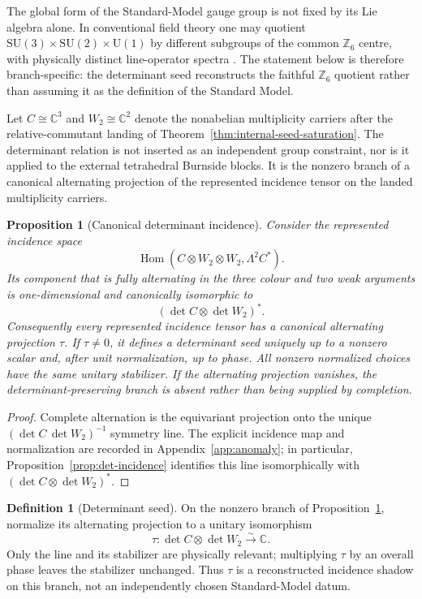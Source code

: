 \documentclass[11pt]{article}
\newtheorem{proposition}[theorem]{Proposition}
\theoremstyle{definition}
\newtheorem{definition}[theorem]{Definition}
\theoremstyle{remark}
\newcommand{\Z}{\mathbb Z}
\newcommand{\C}{\mathbb C}
\newcommand{\Hom}{\operatorname{Hom}}
\newcommand{\U}{\mathrm U}
\newcommand{\SU}{\mathrm{SU}}
\begin{document}
The global form of the Standard-Model gauge group is not fixed by its Lie
algebra alone.  In conventional field theory one may quotient
$\SU(3)\times\SU(2)\times\U(1)$ by different subgroups of the common
$\Z_6$ centre, with physically distinct line-operator spectra
\cite{Hucks1991,Tong2017}.  The statement below is therefore branch-specific:
the determinant seed reconstructs the faithful $\Z_6$ quotient rather than
assuming it as the definition of the Standard Model.

Let $C\cong\C^3$ and $W_2\cong\C^2$ denote the nonabelian multiplicity
carriers after the relative-commutant landing of
Theorem~\ref{thm:internal-seed-saturation}.  The determinant relation is not
inserted as an independent group constraint, nor is it applied to the external
tetrahedral Burnside blocks.  It is the nonzero branch of a canonical
alternating projection of the represented incidence tensor on the landed
multiplicity carriers.

\begin{proposition}[Canonical determinant incidence]
\label{prop:main-det-incidence}
Consider the represented incidence space
\[
\Hom(C\otimes W_2\otimes W_2,\Lambda^2C^*).
\]
Its component that is fully alternating in the three colour and two weak
arguments is one-dimensional and canonically isomorphic to
\[
(\det C\otimes\det W_2)^*.
\]
Consequently every represented incidence tensor has a canonical alternating
projection $\tau$.  If $\tau\neq0$, it defines a determinant seed uniquely
up to a nonzero scalar and, after unit normalization, up to phase.  All nonzero
normalized choices have the same unitary stabilizer.  If the alternating
projection vanishes, the determinant-preserving branch is absent rather than
being supplied by completion.
\end{proposition}

\begin{proof}
Complete alternation is the equivariant projection onto the unique
$(\det C\,\det W_2)^{-1}$ symmetry line.  The explicit incidence map and
normalization are recorded in Appendix~\ref{app:anomaly}; in particular,
Proposition~\ref{prop:det-incidence} identifies this line isomorphically with
$(\det C\otimes\det W_2)^*$.
\end{proof}

\begin{definition}[Determinant seed]
On the nonzero branch of Proposition~\ref{prop:main-det-incidence}, normalize
its alternating projection to a unitary isomorphism
\begin{equation}
\tau:\det C\otimes\det W_2\xrightarrow{\sim}\C.
\label{eq:determinant-seed}
\end{equation}
Only the line and its stabilizer are physically relevant; multiplying $\tau$
by an overall phase leaves the stabilizer unchanged.  Thus $\tau$ is a
reconstructed incidence shadow on this branch, not an independently chosen
Standard-Model datum.
\end{definition}
\end{document}
